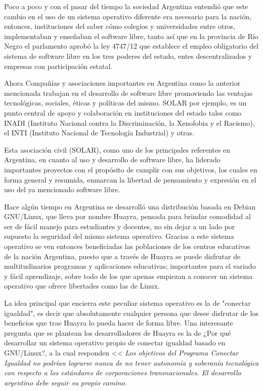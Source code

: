Poco a poco y con el pasar del tiempo la sociedad Argentina entendió que este cambio en el uso de un sistema operativo diferente era necesario para la nación, entonces, 
instituciones del saber cómo colegios y universidades entre otros, implementaban y enseñaban el software libre, tanto así que en la provincia de Río Negro el parlamento aprobó la 
ley 4747/12 que establece el empleo obligatorio del sistema de software libre en los tres poderes del estado,  entes descentralizados y empresas con participación estatal.

Ahora Compañías y asociaciones importantes en Argentina como la anterior mencionada trabajan en el desarrollo de software libre promoviendo las ventajas tecnológicas, sociales, 
éticas y políticas del mismo. SOLAR por ejemplo, es un punto central de apoyo y colaboración en instituciones del estado tales como INADI (Instituto Nacional contra la 
Discriminación, la Xenofobia y el Racismo), el INTI (Instituto Nacional de Tecnología Industrial) y otras.

Esta asociación civil (SOLAR), como uno de los principales referentes en Argentina, en cuanto al uso y desarrollo de software libre, ha liderado importantes proyectos con el 
propósito de cumplir con sus objetivos, los cuales en forma general y resumida, enmarcan la libertad de pensamiento y expresión en el uso del ya mencionado software libre.

Hace algún tiempo en Argentina se desarrolló una distribución basada en Debian GNU/Linux, que lleva por nombre Huayra, pensada para brindar comodidad al ser de fácil manejo para 
estudiantes y docentes, no sin dejar a un lado por supuesto la seguridad del mismo sistema operativo. Gracias a este sistema operativo se ven entonces beneficiadas las 
poblaciones de los centros educativos de la nación Argentina, puesto que a través de Huayra se puede disfrutar de multitudinarios programas y aplicaciones educativas; importantes 
para el  variado y fácil aprendizaje, sobre todo de los que apenas empiezan a conocer un sistema operativo que ofrece libertades como las de Linux.

La idea principal que encierra este peculiar sistema operativo es la de "conectar igualdad", es decir que absolutamente cualquier persona que desee disfrutar de los beneficios 
que trae Huayra lo pueda hacer de forma libre. Una interesante pregunta que se plantean los desarrolladores de Huayra  es la de ¿Por qué desarrollar un sistema operativo propio 
de conectar igualdad basado en GNU/Linux?, a la cual responden <<\textit{ Los objetivos del Programa Conectar Igualdad no podrían lograrse nunca de no tener autonomía y soberanía 
tecnológica con respecto a los estándares de corporaciones transnacionales. El desarrollo argentino debe seguir su propio camino.}

